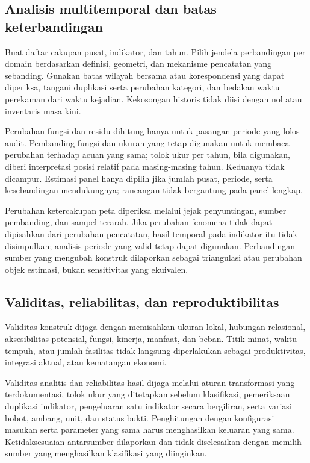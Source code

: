 \documentclass[11pt,a4paper,oneside,openany,indonesian]{report}
\begin{document}
\subsection{Analisis multitemporal dan batas
keterbandingan}\label{analisis-multitemporal-dan-batas-keterbandingan}

Buat daftar cakupan pusat, indikator, dan tahun. Pilih jendela perbandingan
per domain berdasarkan definisi, geometri, dan mekanisme pencatatan yang
sebanding. Gunakan batas wilayah bersama atau korespondensi yang dapat
diperiksa, tangani duplikasi serta perubahan kategori, dan bedakan waktu
perekaman dari waktu kejadian. Kekosongan historis tidak diisi dengan
nol atau inventaris masa kini.

Perubahan fungsi dan residu dihitung hanya untuk pasangan periode yang
lolos audit. Pembanding fungsi dan ukuran yang tetap digunakan untuk
membaca perubahan terhadap acuan yang sama; tolok ukur per tahun, bila
digunakan, diberi interpretasi posisi relatif pada masing-masing tahun.
Keduanya tidak dicampur. Estimasi panel hanya dipilih jika jumlah pusat,
periode, serta kesebandingan mendukungnya; rancangan tidak bergantung
pada panel lengkap.

Perubahan ketercakupan peta diperiksa melalui jejak penyuntingan, sumber
pembanding, dan sampel terarah. Jika perubahan fenomena tidak dapat
dipisahkan dari perubahan pencatatan, hasil temporal pada indikator itu
tidak disimpulkan; analisis periode yang valid tetap dapat digunakan.
Perbandingan sumber yang mengubah konstruk dilaporkan sebagai
triangulasi atau perubahan objek estimasi, bukan sensitivitas yang
ekuivalen.

\subsection{Validitas, reliabilitas, dan
reproduktibilitas}\label{validitas-reliabilitas-dan-reproduktibilitas}

Validitas konstruk dijaga dengan memisahkan ukuran lokal,
hubungan relasional, aksesibilitas potensial, fungsi, kinerja, manfaat,
dan beban. Titik minat, waktu tempuh, atau jumlah fasilitas tidak
langsung diperlakukan sebagai produktivitas, integrasi aktual, atau
kematangan ekonomi.

Validitas analitis dan reliabilitas hasil dijaga melalui aturan
transformasi yang terdokumentasi, tolok ukur yang ditetapkan sebelum
klasifikasi, pemeriksaan duplikasi indikator, pengeluaran satu indikator
secara bergiliran, serta variasi bobot, ambang, unit, dan status bukti.
Penghitungan dengan konfigurasi masukan serta parameter yang sama harus
menghasilkan keluaran yang sama. Ketidaksesuaian antarsumber dilaporkan
dan tidak diselesaikan dengan memilih sumber yang menghasilkan
klasifikasi yang diinginkan.
\end{document}
